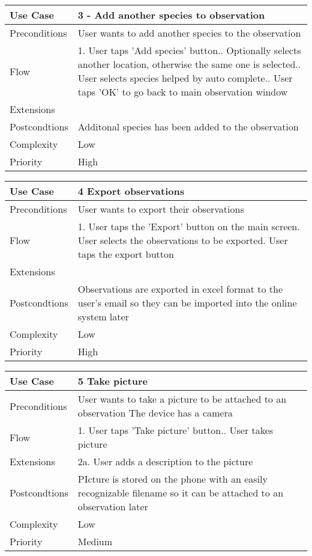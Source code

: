 \begin{tabular}[t]{|l|p{}|}\hline
Use Case&3 - Add another species to observation\\\hline
Preconditions&User wants to add another species to the observation\\\hline
Flow&1. User taps 'Add species' button.\newline
2. Optionally selects another location, otherwise the same one is selected.\newline
3. User selects species helped by auto complete.\newline
4. User taps 'OK' to go back to main observation window \\\hline  
Extensions& \\\hline
Postcondtions&Additonal species has been added to the observation\\\hline
Complexity&Low\\\hline
Priority&High\\\hline
\end{tabular}

\begin{tabular}[t]{|l|p{}|}\hline
Use Case&4  Export  observations\\\hline
Preconditions& User wants to export their observations \\\hline
Flow&1. User taps the 'Export' button on the main screen\newline
2. User selects the observations to be exported\newline
3. User taps the export button\\\hline
Extensions& \\\hline
Postcondtions&Observations are exported in excel format to the user's email so they can be imported into the online system later\\\hline
Complexity&Low\\\hline
Priority&High\\\hline
\end{tabular}

\begin{tabular}[t]{|l|p{}|}\hline
Use Case&5 Take picture\\\hline
Preconditions&User wants to take a picture to be attached to an observation\newline
The device has a camera\\\hline
Flow&1. User taps 'Take picture' button.\newline
2. User takes picture \\\hline
Extensions& 2a. User adds a description to the picture\\\hline
Postcondtions&PIcture is stored on the phone with an easily recognizable filename so it can be attached to an observation later\\\hline
Complexity&Low\\\hline
Priority&Medium\\\hline
\end{tabular}

